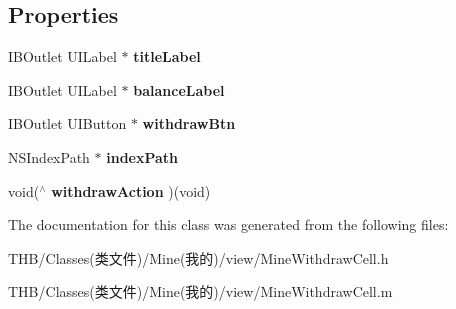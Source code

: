 \subsection*{Properties}
\begin{DoxyCompactItemize}
\item 
\mbox{\label{interface_mine_withdraw_cell_a0aa5b259247291e3d72b4c2885913221}} 
I\+B\+Outlet U\+I\+Label $\ast$ {\bfseries title\+Label}
\item 
\mbox{\label{interface_mine_withdraw_cell_af262c5c50fab5855f329e6fff5bc70ac}} 
I\+B\+Outlet U\+I\+Label $\ast$ {\bfseries balance\+Label}
\item 
\mbox{\label{interface_mine_withdraw_cell_ae3f957832784f039e2b1cc4b80ccc039}} 
I\+B\+Outlet U\+I\+Button $\ast$ {\bfseries withdraw\+Btn}
\item 
\mbox{\label{interface_mine_withdraw_cell_a6ac0a1c585bfc374603999e31d6fb87d}} 
N\+S\+Index\+Path $\ast$ {\bfseries index\+Path}
\item 
\mbox{\label{interface_mine_withdraw_cell_a3e1e7fc659caddc7587def534703cffc}} 
void($^\wedge$ {\bfseries withdraw\+Action} )(void)
\end{DoxyCompactItemize}


The documentation for this class was generated from the following files\+:\begin{DoxyCompactItemize}
\item 
T\+H\+B/\+Classes(类文件)/\+Mine(我的)/view/Mine\+Withdraw\+Cell.\+h\item 
T\+H\+B/\+Classes(类文件)/\+Mine(我的)/view/Mine\+Withdraw\+Cell.\+m\end{DoxyCompactItemize}
